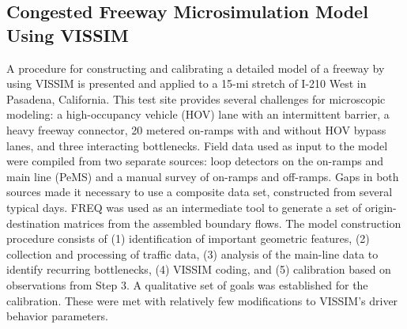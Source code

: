 \documentclass{article}
\begin{document}
\subsection*{Congested Freeway Microsimulation Model Using VISSIM \cite{congestedMicro}
}
A procedure for constructing and calibrating a detailed model of a freeway by using VISSIM is presented and applied to a 15-mi stretch of I-210 West in Pasadena, California. This test site provides several challenges for microscopic modeling: a high-occupancy vehicle (HOV) lane with an intermittent barrier, a heavy freeway connector, 20 metered on-ramps with and without HOV bypass lanes, and three interacting bottlenecks. Field data used as input to the model were compiled from two separate sources: loop detectors on the on-ramps and main line (PeMS) and a manual survey of on-ramps and off-ramps. Gaps in both sources made it necessary to use a composite data set, constructed from several typical days. FREQ was used as an intermediate tool to generate a set of origin-destination matrices from the assembled boundary flows. The model construction procedure consists of (1) identification of important geometric features, (2) collection and processing of traffic data, (3) analysis of the main-line data to identify recurring bottlenecks, (4) VISSIM coding, and (5) calibration based on observations from Step 3. A qualitative set of goals was established for the calibration. These were met with relatively few modifications to VISSIM's driver behavior parameters.
\end{document}
